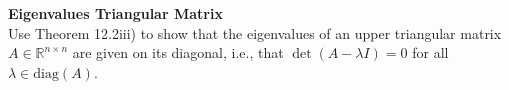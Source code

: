 \textbf{Eigenvalues Triangular Matrix}\\
Use Theorem 12.2iii) to show that the eigenvalues of an upper triangular matrix $A \in \mathbb{R}^{n \times n}$ are given on its diagonal, i.e., that 
$\det (A - \lambda I)=0$ for all $\lambda \in \textrm{diag}(A)$.